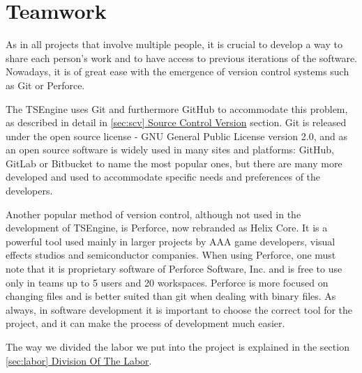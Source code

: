\newpage
\section{Teamwork}
\label{sec:teamwork}
\hspace{\parindent} %

As in all projects that involve multiple people, it is crucial to develop a way to share each person's work and to have access to previous iterations of the software. Nowadays, it is of great ease with the emergence of version control systems such as Git or Perforce. 

The TSEngine uses Git and furthermore GitHub to accommodate this problem, as described in detail in \hyperref[sec:scv]{\ref*{sec:scv} Source Control Version} section. Git is released under the open source license -  GNU General Public License version 2.0, and as an open source software is widely used in many sites and platforms: GitHub, GitLab or Bitbucket to name the most popular ones, but there are many more developed and used to accommodate specific needs and preferences of the developers.

Another popular method of version control, although not used in the development of TSEngine, is Perforce, now rebranded as Helix Core. It is a powerful tool used mainly in larger projects by AAA game developers, visual effects studios and semiconductor companies. When using Perforce, one must note that it is proprietary software of Perforce Software, Inc. and is free to use only in teams up to 5 users and 20 workspaces. Perforce is more focused on changing files and is better suited than git when dealing with binary files. As always, in software development it is important to choose the correct tool for the project, and it can make the process of development much easier.

The way we divided the labor we put into the project is explained in the section \hyperref[sec:labor]{\ref*{sec:labor} Division Of The Labor}.



